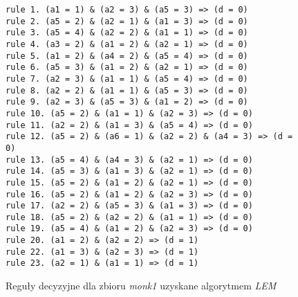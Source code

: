 \begin{figure}
\begin{verbatim}
rule 1. (a1 = 1) & (a2 = 3) & (a5 = 3) => (d = 0)
rule 2. (a5 = 2) & (a2 = 1) & (a1 = 3) => (d = 0)
rule 3. (a5 = 4) & (a2 = 2) & (a1 = 1) => (d = 0)
rule 4. (a3 = 2) & (a1 = 2) & (a2 = 1) => (d = 0)
rule 5. (a1 = 2) & (a4 = 2) & (a5 = 4) => (d = 0)
rule 6. (a5 = 3) & (a1 = 2) & (a2 = 1) => (d = 0)
rule 7. (a2 = 3) & (a1 = 1) & (a5 = 4) => (d = 0)
rule 8. (a2 = 2) & (a1 = 1) & (a5 = 3) => (d = 0)
rule 9. (a2 = 3) & (a5 = 3) & (a1 = 2) => (d = 0)
rule 10. (a5 = 2) & (a1 = 1) & (a2 = 3) => (d = 0)
rule 11. (a2 = 2) & (a1 = 3) & (a5 = 4) => (d = 0)
rule 12. (a5 = 2) & (a6 = 1) & (a2 = 2) & (a4 = 3) => (d = 0)
rule 13. (a5 = 4) & (a4 = 3) & (a2 = 1) => (d = 0)
rule 14. (a5 = 3) & (a1 = 3) & (a2 = 1) => (d = 0)
rule 15. (a5 = 2) & (a1 = 2) & (a2 = 1) => (d = 0)
rule 16. (a5 = 2) & (a1 = 2) & (a2 = 3) => (d = 0)
rule 17. (a2 = 2) & (a5 = 3) & (a1 = 3) => (d = 0)
rule 18. (a5 = 2) & (a2 = 2) & (a1 = 1) => (d = 0)
rule 19. (a5 = 4) & (a1 = 2) & (a2 = 3) => (d = 0)
rule 20. (a1 = 2) & (a2 = 2) => (d = 1)
rule 22. (a1 = 3) & (a2 = 3) => (d = 1)
rule 23. (a2 = 1) & (a1 = 1) => (d = 1)
\end{verbatim}
\caption{Reguły decyzyjne dla zbioru \emph{monk1} uzyskane algorytmem \emph{LEM}}
\label{p2t2-monk-rules}
\end{figure}
